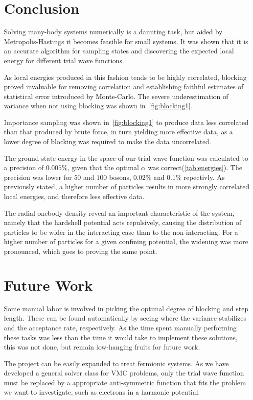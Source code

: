 \begin{minipage}{\columnwidth}
\section{Conclusion}\label{sec:Conclusion}
Solving many-body systems numerically is a daunting task, but aided by
Metropolis-Hastings it becomes feasible for small systems. It was shown that it
is an accurate algorithm for sampling states and discovering the expected local
energy for different trial wave functions.

As local energies produced in this fashion tends to be highly correlated,
blocking proved invaluable for removing correlation and establishing faithful
estimates of statistical error introduced by Monte-Carlo. The severe
underestimation of variance when not using blocking was shown in~\cref{fig:blocking1}.

Importance sampling was shown in~\cref{fig:blocking1} to produce data less
correlated than that produced by brute force, in turn yielding more effective
data, as a lower degree of blocking was required to make the data uncorrelated.  

The ground state energy in the space of our trial wave function was calculated
to a precision of $0.005\%$, given that the optimal $\alpha$ was
correct(\cref{tab:energies}). The precision was lower for $50$ and $100$
bosons, $0.02\%$ and $0.1\%$ repectivly. As previously stated, a higher number
of particles results in more strongly correlated local energies, and therefore
less effective data.  

The radial onebody density reveal an important characteristic of the system,
namely that the hardshell potential acts repulsively, causing the distribution
of particles to be wider in the interacting case than to the non-interacting.
For a higher number of particles for a given confining potential, the widening
was more pronounced, which goes to proving the same point.   

\end{minipage}

\section{Future Work}
Some manual labor is involved in picking the optimal degree of blocking and step
length. These can be found automatically by seeing where the variance stabilizes
and the acceptance rate, respectively. As the time spent manually performing
these tasks was less than the time it would take to implement these solutions,
this was not done, but remain low-hanging fruits for future work.

The project can be easily expanded to treat fermionic systems. As we have
developed a general solver class for VMC problems, only 
the trial wave function must be replaced by a appropriate anti-symmetric
function that fits the problem we want to investigate, such as electrons in
a harmonic potential.    
